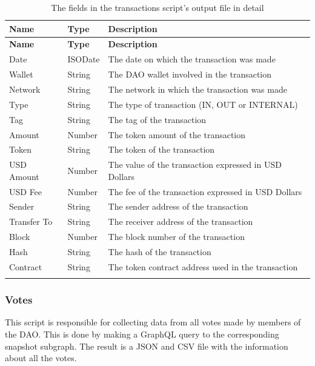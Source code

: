 \documentclass[MSE,Master,english]{twbook}%
\begin{document}
\begin{xltabular}{\textwidth}{|l|l|X|}
  \hline
  \textbf{Name} & \textbf{Type} & \textbf{Description}                         \\ \hline
  \endfirsthead
  \hline
  \textbf{Name} & \textbf{Type} & \textbf{Description}                         \\ \hline
  \endhead
  Date        & ISODate & The date on which the transaction was made            \\ \hline
  Wallet      & String  & The \gls{DAO} wallet involved in the transaction            \\ \hline
  Network     & String  & The network in which the transaction was made         \\ \hline
  Type        & String  & The type of transaction (IN, OUT or INTERNAL)         \\ \hline
  Tag         & String  & The tag of the transaction                            \\ \hline
  Amount      & Number  & The token amount of the transaction                   \\ \hline
  Token       & String  & The token of the transaction                          \\ \hline
  USD Amount  & Number  & The value of the transaction expressed in USD Dollars \\ \hline
  USD Fee     & Number  & The fee of the transaction expressed in USD Dollars   \\ \hline
  Sender      & String  & The sender address of the transaction                 \\ \hline
  Transfer To & String  & The receiver address of the transaction               \\ \hline
  Block       & Number  & The block number of the transaction                   \\ \hline
  Hash        & String  & The hash of the transaction                           \\ \hline
  Contract    & String  & The token contract address used in the transaction    \\ \hline
  \caption{The fields in the transactions script's output file in detail}
  \label{table:transactions}
\end{xltabular}

\subsubsection{Votes\label{subsec_votes}}
This script is responsible for collecting data from all votes made by members of the \gls{DAO}. This is done by making a GraphQL query to the corresponding snapshot subgraph. The result is a JSON and CSV file with the information about all the votes. \\
\end{document}
